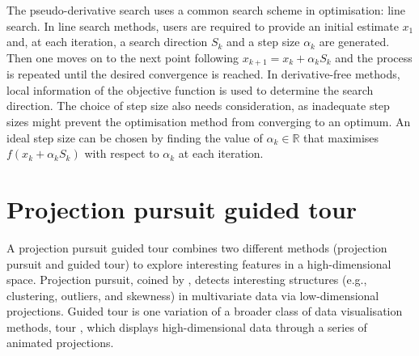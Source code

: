 The pseudo-derivative search uses a common search scheme in
optimisation: line search. In line search methods, users are required to
provide an initial estimate \(x_{1}\) and, at each iteration, a search
direction \(S_k\) and a step size \(\alpha_k\) are generated. Then one
moves on to the next point following \(x_{k+1} = x_k + \alpha_kS_k\) and
the process is repeated until the desired convergence is reached. In
derivative-free methods, local information of the objective function is
used to determine the search direction. The choice of step size also
needs consideration, as inadequate step sizes might prevent the
optimisation method from converging to an optimum. An ideal step size
can be chosen by finding the value of \(\alpha_k \in \mathbb{R}\) that
maximises \(f(x_k + \alpha_kS_k)\) with respect to \(\alpha_k\) at each
iteration.

\hypertarget{projection-pursuit-guided-tour}{%
\section{Projection pursuit guided
tour}\label{projection-pursuit-guided-tour}}

A projection pursuit guided tour combines two different methods
(projection pursuit and guided tour) to explore interesting features in
a high-dimensional space. Projection pursuit, coined by
\citet{friedman1974projection}, detects interesting structures (e.g.,
clustering, outliers, and skewness) in multivariate data via
low-dimensional projections. Guided tour \citep{cook1995grand} is one
variation of a broader class of data visualisation methods, tour
\citep{buja2005computational}, which displays high-dimensional data
through a series of animated projections.

